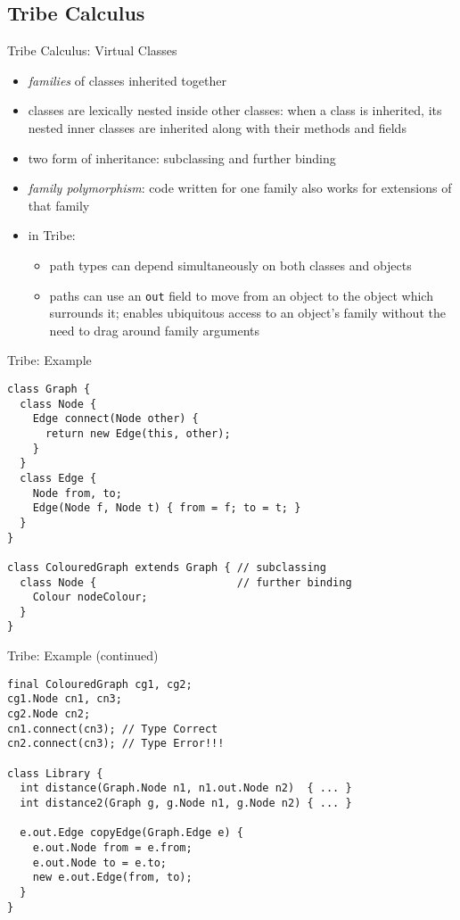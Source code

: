 \documentclass{beamer}
\begin{document}
\subsection{Tribe Calculus}

\begin{frame}{Tribe Calculus: Virtual Classes}
\begin{itemize}
\item {\it families} of classes inherited together
\item classes are lexically nested inside other classes: when a class
  is inherited, its nested inner classes are inherited along with
  their methods and fields
\item two form of inheritance: subclassing and further binding
\item {\it family polymorphism}: code written for one family
  also works for extensions of that family
\item in Tribe:\begin{itemize}
\item path types can depend simultaneously on both classes and objects
\item paths can use an {\tt out} field to move from an object to the
  object which surrounds it; enables ubiquitous access to an object's
  family without the need to drag around family arguments
\end{itemize}
\end{itemize}
\end{frame}

\begin{frame}[fragile]{Tribe: Example}
\begin{verbatim}
class Graph {
  class Node {
    Edge connect(Node other) {
      return new Edge(this, other);
    }
  }
  class Edge {
    Node from, to;
    Edge(Node f, Node t) { from = f; to = t; }
  }
}

class ColouredGraph extends Graph { // subclassing
  class Node {                      // further binding
    Colour nodeColour;
  }
}
\end{verbatim}
\end{frame}

\begin{frame}[fragile]{Tribe: Example (continued)}
\begin{verbatim}
final ColouredGraph cg1, cg2;
cg1.Node cn1, cn3;
cg2.Node cn2;
cn1.connect(cn3); // Type Correct
cn2.connect(cn3); // Type Error!!!

class Library {
  int distance(Graph.Node n1, n1.out.Node n2)  { ... }
  int distance2(Graph g, g.Node n1, g.Node n2) { ... }

  e.out.Edge copyEdge(Graph.Edge e) {
    e.out.Node from = e.from;
    e.out.Node to = e.to;
    new e.out.Edge(from, to);
  }
}
\end{verbatim}
\end{frame}
\end{document}
